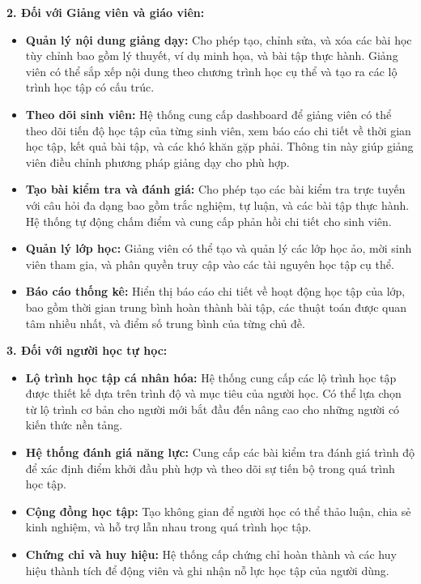 \textbf{2. Đối với Giảng viên và giáo viên:}

\begin{itemize}
\item \textbf{Quản lý nội dung giảng dạy:} Cho phép tạo, chỉnh sửa, và xóa các bài học tùy chỉnh bao gồm lý thuyết, ví dụ minh họa, và bài tập thực hành. Giảng viên có thể sắp xếp nội dung theo chương trình học cụ thể và tạo ra các lộ trình học tập có cấu trúc.

\item \textbf{Theo dõi sinh viên:} Hệ thống cung cấp dashboard để giảng viên có thể theo dõi tiến độ học tập của từng sinh viên, xem báo cáo chi tiết về thời gian học tập, kết quả bài tập, và các khó khăn gặp phải. Thông tin này giúp giảng viên điều chỉnh phương pháp giảng dạy cho phù hợp.

\item \textbf{Tạo bài kiểm tra và đánh giá:} Cho phép tạo các bài kiểm tra trực tuyến với câu hỏi đa dạng bao gồm trắc nghiệm, tự luận, và các bài tập thực hành. Hệ thống tự động chấm điểm và cung cấp phản hồi chi tiết cho sinh viên.

\item \textbf{Quản lý lớp học:} Giảng viên có thể tạo và quản lý các lớp học ảo, mời sinh viên tham gia, và phân quyền truy cập vào các tài nguyên học tập cụ thể.

\item \textbf{Báo cáo thống kê:} Hiển thị báo cáo chi tiết về hoạt động học tập của lớp, bao gồm thời gian trung bình hoàn thành bài tập, các thuật toán được quan tâm nhiều nhất, và điểm số trung bình của từng chủ đề.
\end{itemize}

\textbf{3. Đối với người học tự học:}

\begin{itemize}
\item \textbf{Lộ trình học tập cá nhân hóa:} Hệ thống cung cấp các lộ trình học tập được thiết kế dựa trên trình độ và mục tiêu của người học. Có thể lựa chọn từ lộ trình cơ bản cho người mới bắt đầu đến nâng cao cho những người có kiến thức nền tảng.

\item \textbf{Hệ thống đánh giá năng lực:} Cung cấp các bài kiểm tra đánh giá trình độ để xác định điểm khởi đầu phù hợp và theo dõi sự tiến bộ trong quá trình học tập.

\item \textbf{Cộng đồng học tập:} Tạo không gian để người học có thể thảo luận, chia sẻ kinh nghiệm, và hỗ trợ lẫn nhau trong quá trình học tập.

\item \textbf{Chứng chỉ và huy hiệu:} Hệ thống cấp chứng chỉ hoàn thành và các huy hiệu thành tích để động viên và ghi nhận nỗ lực học tập của người dùng.
\end{itemize}

